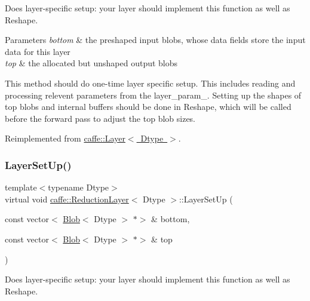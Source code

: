 Does layer-\/specific setup\+: your layer should implement this function as well as Reshape. 


\begin{DoxyParams}{Parameters}
{\em bottom} & the preshaped input blobs, whose data fields store the input data for this layer \\
\hline
{\em top} & the allocated but unshaped output blobs\\
\hline
\end{DoxyParams}
This method should do one-\/time layer specific setup. This includes reading and processing relevent parameters from the {\ttfamily layer\+\_\+param\+\_\+}. Setting up the shapes of top blobs and internal buffers should be done in {\ttfamily Reshape}, which will be called before the forward pass to adjust the top blob sizes. 

Reimplemented from \mbox{\hyperlink{classcaffe_1_1_layer_a481323a3e0972c682787f2137468c29f}{caffe\+::\+Layer$<$ Dtype $>$}}.

\mbox{\label{classcaffe_1_1_reduction_layer_a5503c3dac40e2a92d8bfca77d0712dfb}} 
\subsubsection{\texorpdfstring{Layer\+Set\+Up()}{LayerSetUp()}\hspace{0.1cm}{\footnotesize\ttfamily [2/2]}}
{\footnotesize\ttfamily template$<$typename Dtype$>$ \\
virtual void \mbox{\hyperlink{classcaffe_1_1_reduction_layer}{caffe\+::\+Reduction\+Layer}}$<$ Dtype $>$\+::Layer\+Set\+Up (\begin{DoxyParamCaption}\item[{const vector$<$ \mbox{\hyperlink{classcaffe_1_1_blob}{Blob}}$<$ Dtype $>$ $\ast$$>$ \&}]{bottom,  }\item[{const vector$<$ \mbox{\hyperlink{classcaffe_1_1_blob}{Blob}}$<$ Dtype $>$ $\ast$$>$ \&}]{top }\end{DoxyParamCaption})\hspace{0.3cm}{\ttfamily [virtual]}}



Does layer-\/specific setup\+: your layer should implement this function as well as Reshape. 


